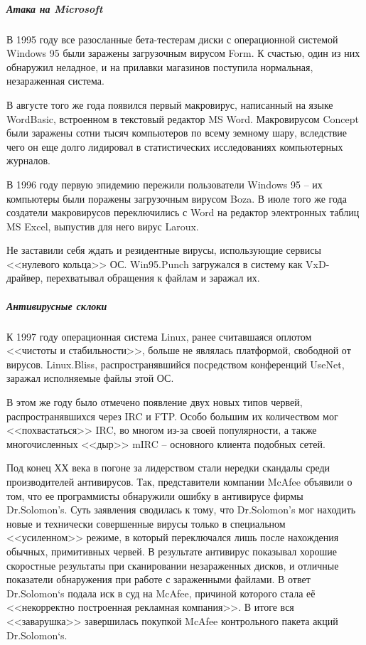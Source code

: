 %
\subparagraph{Атака на Microsoft}
%
В 1995 году все разосланные бета-тестерам диски с операционной системой
Windows 95 были заражены загрузочным вирусом Form. К счастью, один из них
обнаружил неладное, и на прилавки магазинов поступила нормальная,
незараженная система.

В августе того же года появился первый макровирус, написанный на языке
WordBasic, встроенном в текстовый редактор MS Word. Макровирусом Concept были
заражены сотни тысяч компьютеров по всему земному шару, вследствие чего он
еще долго лидировал в статистических исследованиях компьютерных журналов.

В 1996 году первую эпидемию пережили пользователи Windows 95 – их компьютеры
были поражены загрузочным вирусом Boza. В июле того же года создатели
макровирусов переключились с Word на редактор электронных таблиц MS Excel,
выпустив для него вирус Laroux.

Не заставили себя ждать и резидентные вирусы, использующие сервисы <<нулевого
кольца>> ОС. Win95.Punch загружался в систему как VxD-драйвер, перехватывал
обращения к файлам и заражал их.

%
\subparagraph{Антивирусные склоки}
%
К 1997 году операционная система Linux, ранее считавшаяся оплотом <<чистоты и
стабильности>>, больше не являлась платформой, свободной от вирусов.
Linux.Bliss, распространявшийся посредством конференций UseNet, заражал
исполняемые файлы этой ОС.

В этом же году было отмечено появление двух новых типов червей,
распространявшихся через IRC и FTP. Особо большим их количеством мог
<<похвастаться>> IRC, во многом из-за своей популярности, а также
многочисленных <<дыр>> mIRC – основного клиента подобных сетей.

Под конец ХХ века в погоне за лидерством стали нередки скандалы среди
производителей антивирусов. Так, представители компании McAfee объявили о
том, что ее программисты обнаружили ошибку в антивирусе фирмы Dr.Solomon’s.
Суть заявления сводилась к тому, что Dr.Solomon’s мог находить новые и
технически совершенные вирусы только в специальном <<усиленном>> режиме, в
который переключался лишь после нахождения обычных, примитивных червей. В
результате антивирус показывал хорошие скоростные результаты при сканировании
незараженных дисков, и отличные показатели обнаружения при работе с
зараженными файлами. В ответ Dr.Solomon`s подала иск в суд на McAfee,
причиной которого стала её <<некорректно построенная рекламная компания>>. В
итоге вся <<заварушка>> завершилась покупкой McAfee контрольного пакета акций
Dr.Solomon`s.

